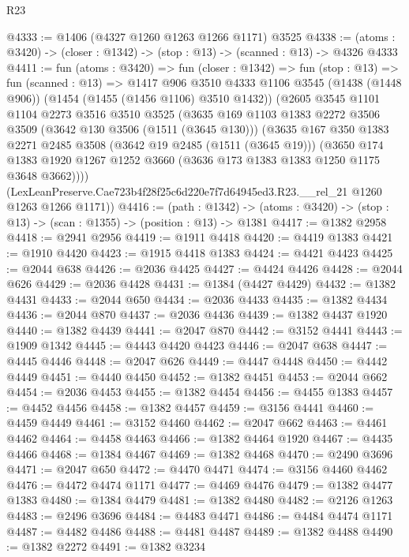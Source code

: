 \begin{lexlean}{R23}
\begin{coremodule}
@4333 := @1406 (@4327 @1260 @1263 @1266 @1171) @3525
@4338 := (atoms : @3420) -> (closer : @1342) -> (stop : @13) -> (scanned : @13) -> @4326 @4333
@4411 := fun (atoms : @3420) =>
  fun (closer : @1342) =>
  fun (stop : @13) =>
  fun (scanned : @13) =>
  @1417
    @906
    @3510
    @4333
    @1106
    @3545
    (@1438 (@1448 @906))
    (@1454 (@1455 (@1456 @1106) @3510 @1432))
    (@2605
      @3545
      @1101
      @1104
      @2273
      @3516
      @3510
      @3525
      (@3635
        @169
        @1103
        @1383
        @2272
        @3506
        @3509
        (@3642 @130 @3506 (@1511 (@3645 @130)))
        (@3635
          @167
          @350
          @1383
          @2271
          @2485
          @3508
          (@3642 @19 @2485 (@1511 (@3645 @19)))
          (@3650
            @174
            @1383
            @1920
            @1267
            @1252
            @3660
            (@3636 @173 @1383 @1383 @1250 @1175 @3648 @3662))))
      (LexLeanPreserve.Cae723b4f28f25c6d220e7f7d64945ed3.R23.__rel_21 @1260 @1263 @1266 @1171))
@4416 := (path : @1342) ->
  (atoms : @3420) -> (stop : @13) -> (scan : @1355) -> (position : @13) -> @1381
@4417 := @1382 @2958
@4418 := @2941 @2956
@4419 := @1911 @4418
@4420 := @4419 @1383
@4421 := @1910 @4420
@4423 := @1915 @4418 @1383
@4424 := @4421 @4423
@4425 := @2044 @638
@4426 := @2036 @4425
@4427 := @4424 @4426
@4428 := @2044 @626
@4429 := @2036 @4428
@4431 := @1384 (@4427 @4429)
@4432 := @1382 @4431
@4433 := @2044 @650
@4434 := @2036 @4433
@4435 := @1382 @4434
@4436 := @2044 @870
@4437 := @2036 @4436
@4439 := @1382 @4437 @1920
@4440 := @1382 @4439
@4441 := @2047 @870
@4442 := @3152 @4441
@4443 := @1909 @1342
@4445 := @4443 @4420 @4423
@4446 := @2047 @638
@4447 := @4445 @4446
@4448 := @2047 @626
@4449 := @4447 @4448
@4450 := @4442 @4449
@4451 := @4440 @4450
@4452 := @1382 @4451
@4453 := @2044 @662
@4454 := @2036 @4453
@4455 := @1382 @4454
@4456 := @4455 @1383
@4457 := @4452 @4456
@4458 := @1382 @4457
@4459 := @3156 @4441
@4460 := @4459 @4449
@4461 := @3152 @4460
@4462 := @2047 @662
@4463 := @4461 @4462
@4464 := @4458 @4463
@4466 := @1382 @4464 @1920
@4467 := @4435 @4466
@4468 := @1384 @4467
@4469 := @1382 @4468
@4470 := @2490 @3696
@4471 := @2047 @650
@4472 := @4470 @4471
@4474 := @3156 @4460 @4462
@4476 := @4472 @4474 @1171
@4477 := @4469 @4476
@4479 := @1382 @4477 @1383
@4480 := @1384 @4479
@4481 := @1382 @4480
@4482 := @2126 @1263
@4483 := @2496 @3696
@4484 := @4483 @4471
@4486 := @4484 @4474 @1171
@4487 := @4482 @4486
@4488 := @4481 @4487
@4489 := @1382 @4488
@4490 := @1382 @2272
@4491 := @1382 @3234

\end{coremodule}
\end{lexlean}

